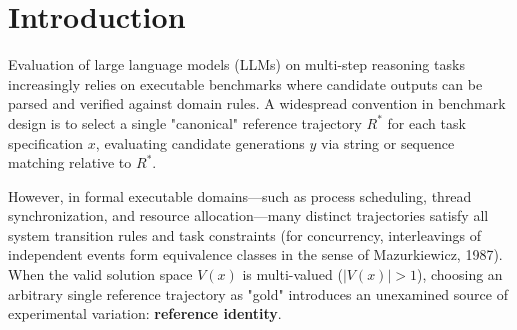 \documentclass[11pt]{article}
\begin{document}
\begin{abstract}
because every valid output equals exactly one valid reference, $\mathbb{E}[E_2] = E_3/|V(x)|$ ($r = 1.000$ over 42 model--task cells). Scoring an output as correct if it matches any of $k$ sampled references restores detection of the oracle-significant differences to 48--57\% at $k=5$ and 84--88\% at $k=25$ (100\% at $k=|V(x)|$), whereas an inverse-$|V|$ (Horvitz--Thompson) correction removes the bias but not the variance and does not restore power (Section 4.7). Stated-convention prompts do not remove noncanonical outputs ($\text{FRR}_{\text{norm}} = 0.625$), and a small feasibility arm on Gemma 3 12B ($n_{\text{valid}} = 42$) shows the same pattern ($\text{FRR}_{\text{norm}} = 0.619$). Replacing gold references with a reference-independent executable validator ($E_3$) removes reference dependence by construction ($\text{Kendall } \tau_b = 1.000$); the empirical content of this study is the measured cost of not doing so. A preregistered follow-up on four Claude models that clear the capability floor (73\%--99\% validity) reproduces the detection failure (reference matching detects $E_3$-separated differences in 3.0\% of draws), finds canonical-solution inflation of 2.3--3.3 times uniform choice, and raises the uniform-reference winner-reversal rate to 26.9\%, while a preregistered 1.5-fold canonical ranking-distortion prediction was not met (Section 4.8). The main results come from one 24-world benchmark and four sub-10B models, and the RCR metrics are a post-hoc reanalysis of a pilot whose preregistered verdict was CONDITIONAL (Sections 9--10).
\end{abstract}
\section{Introduction}
Evaluation of large language models (LLMs) on multi-step reasoning tasks increasingly relies on executable benchmarks where candidate outputs can be parsed and verified against domain rules. A widespread convention in benchmark design is to select a single "canonical" reference trajectory $R^*$ for each task specification $x$, evaluating candidate generations $y$ via string or sequence matching relative to $R^*$.

However, in formal executable domains---such as process scheduling, thread synchronization, and resource allocation---many distinct trajectories satisfy all system transition rules and task constraints (for concurrency, interleavings of independent events form equivalence classes in the sense of Mazurkiewicz, 1987). When the valid solution space $V(x)$ is multi-valued ($|V(x)| > 1$), choosing an arbitrary single reference trajectory as "gold" introduces an unexamined source of experimental variation: \textbf{reference identity}.
\end{document}
